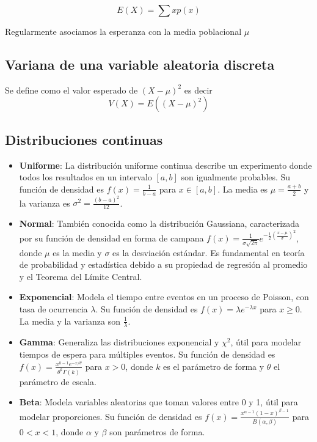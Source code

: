 \documentclass{article}
\begin{document}
\[E(X) = \sum xp(x)\]

Regularmente asociamos la esperanza con la media poblacional $\mu$

\subsection{Variana de una variable aleatoria discreta}

Se define como el valor esperado de $(X - \mu)^2$ es decir
\[V(X) = E((X-\mu)^2)\]

\subsection{Distribuciones continuas}

\begin{itemize}
    \item \textbf{Uniforme}: La distribución uniforme continua describe un experimento donde todos los resultados en un intervalo \([a, b]\) son igualmente probables. Su función de densidad es $f(x) = \frac{1}{b-a}$ para $x \in [a, b]$. La media es $\mu = \frac{a+b}{2}$ y la varianza es $\sigma^2 = \frac{(b-a)^2}{12}$.

    \item \textbf{Normal}: También conocida como la distribución Gaussiana, caracterizada por su función de densidad en forma de campana $f(x) = \frac{1}{\sigma\sqrt{2\pi}}e^{-\frac{1}{2}(\frac{x-\mu}{\sigma})^2}$, donde $\mu$ es la media y $\sigma$ es la desviación estándar. Es fundamental en teoría de probabilidad y estadística debido a su propiedad de regresión al promedio y el Teorema del Límite Central.

    \item \textbf{Exponencial}: Modela el tiempo entre eventos en un proceso de Poisson, con tasa de ocurrencia $\lambda$. Su función de densidad es $f(x) = \lambda e^{-\lambda x}$ para $x \geq 0$. La media y la varianza son $\frac{1}{\lambda}$.

    \item \textbf{Gamma}: Generaliza las distribuciones exponencial y $\chi^2$, útil para modelar tiempos de espera para múltiples eventos. Su función de densidad es $f(x) = \frac{x^{k-1}e^{-x/\theta}}{\theta^k \Gamma(k)}$ para $x > 0$, donde $k$ es el parámetro de forma y $\theta$ el parámetro de escala.

    \item \textbf{Beta}: Modela variables aleatorias que toman valores entre 0 y 1, útil para modelar proporciones. Su función de densidad es $f(x) = \frac{x^{\alpha-1}(1-x)^{\beta-1}}{B(\alpha, \beta)}$ para $0 < x < 1$, donde $\alpha$ y $\beta$ son parámetros de forma.


\end{itemize}
\end{document}
